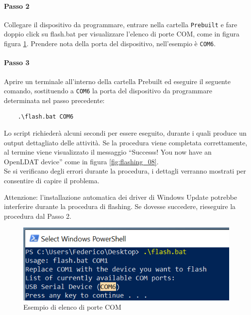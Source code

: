 \paragraph{Passo 2} Collegare il dispositivo da programmare, entrare nella cartella \texttt{Prebuilt} e fare doppio click su flash.bat per visualizzare l'elenco di porte COM, come in figura figura \ref{fig:flashing_07}. Prendere nota della porta del dispositivo, nell'esempio è \texttt{COM6}.

\paragraph{Passo 3} Aprire un terminale all'interno della cartella Prebuilt ed eseguire il seguente comando, sostituendo a \texttt{COM6} la porta del dispositivo da programmare determinata nel passo precedente:
\begin{verbatim}
	.\flash.bat COM6
\end{verbatim}

Lo script richiederà alcuni secondi per essere eseguito, durante i quali produce un output dettagliato delle attività. Se la procedura viene completata correttamente, al termine viene visualizzato il messaggio ``Successs! You now have an OpenLDAT device'' come in figura \ref{fig:flashing_08}.\\
Se si verificano degli errori durante la procedura, i dettagli verranno mostrati per consentire di capire il problema.

Attenzione: l'installazione automatica dei driver di Windows Update potrebbe interferire durante la procedura di flashing. Se dovesse succedere, rieseguire la procedura dal Passo 2.

\begin{figure}[H]
	\centering
	\includegraphics[width=.7\textwidth]{Dispositivo_files/flashing_07.png}
	\caption{Esempio di elenco di porte COM}
	\label{fig:flashing_07}
\end{figure}

